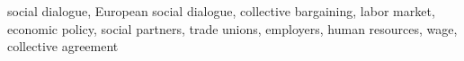 social dialogue, European social dialogue, collective bargaining, labor market, economic policy, social partners, trade unions, employers, human resources, wage, collective agreement